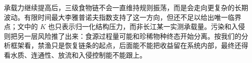 承载力继续提高后，三级食物链不会一直维持规则振荡，而是会走向更复杂的长期波动。有限时间最大李雅普诺夫指数支持了这一方向，但还不足以给出唯一临界点；文中的 $K$ 也只表示归一化结构压力，而非长江某一实测承载量。污染和入侵则把另一层风险推了出来：食源过程量可能和珍稀物种终态开始分离。按我们的分析框架看，禁渔只是恢复链条的起点，后面能不能把收益留在系统内部，最终还得看水质、连通性、放流和入侵控制能不能跟上。
